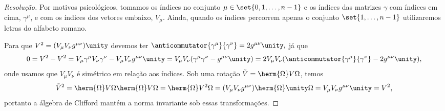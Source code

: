 \begin{proof}[Resolução]
    Por motivos psicológicos, tomamos os índices no conjunto \(\mu \in \set{0,1, \dots, n-1}\) e os índices das matrizes \(\gamma\) com índices em cima, \(\gamma^\mu\), e com os índices dos vetores embaixo, \(V_\mu.\) Ainda, quando os índices percorrem apenas o conjunto \(\set{1,\dots, n-1}\) utilizaremos letras do alfabeto romano.

    Para que \(V^2 = (V_\mu V_\nu g^{\mu\nu})\unity\) devemos ter \(\anticommutator{\gamma^\mu}{\gamma^\nu} = 2 g^{\mu \nu} \unity,\) já que
    \begin{equation*}
        0 = V^2 - V^2 = V_\mu \gamma^\mu V_\nu \gamma^\nu - V_\mu V_\nu g^{\mu\nu}\unity = V_\mu V_\nu (\gamma^\mu \gamma^\nu - g^{\mu\nu} \unity) = 2V_\mu V_\nu (\anticommutator{\gamma^\mu}{\gamma^\nu} - 2 g^{\mu\nu} \unity),
    \end{equation*}
    onde usamos que \(V_\mu V_\nu\) é simétrico em relação aos índices. Sob uma rotação \(\tilde{V} = \herm{\Omega} V \Omega\), temos
    \begin{equation*}
        \tilde{V}^2 = \herm{\Omega} V \Omega \herm{\Omega} V \Omega = \herm{\Omega} V^2 \Omega = (V_\mu V_\nu g^{\mu\nu}) \herm{\Omega} \unity \Omega = V_\mu V_\nu g^{\mu\nu} \unity = V^2,
    \end{equation*}
    portanto a álgebra de Clifford mantém a norma invariante sob essas transformações.


\end{proof}
